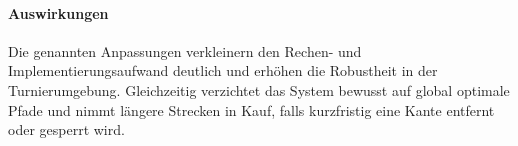\documentclass[main.tex]{subfiles} %
\begin{document}
\paragraph{Auswirkungen}
Die genannten Anpassungen verkleinern den Rechen- und
Implementierungsaufwand deutlich und erhöhen die Robustheit in der
Turnierumgebung.  Gleichzeitig verzichtet das System bewusst auf global
optimale Pfade und nimmt längere Strecken in Kauf, falls kurzfristig eine
Kante entfernt oder gesperrt wird.
\end{document}
